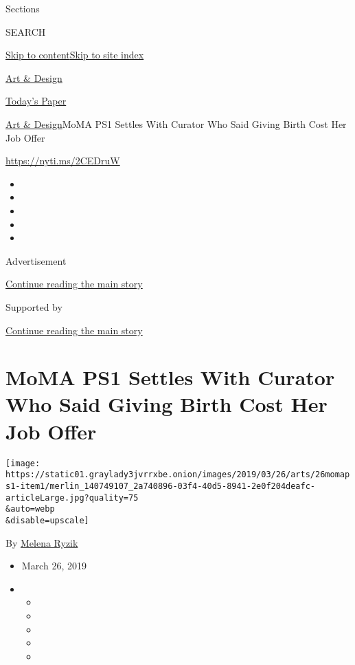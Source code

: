 Sections

SEARCH

\protect\hyperlink{site-content}{Skip to
content}\protect\hyperlink{site-index}{Skip to site index}

\href{https://www.nytimes3xbfgragh.onion/section/arts/design}{Art \&
Design}

\href{https://myaccount.nytimes3xbfgragh.onion/auth/login?response_type=cookie\&client_id=vi}{}

\href{https://www.nytimes3xbfgragh.onion/section/todayspaper}{Today's
Paper}

\href{/section/arts/design}{Art \& Design}\textbar{}MoMA PS1 Settles
With Curator Who Said Giving Birth Cost Her Job Offer

\url{https://nyti.ms/2CEDruW}

\begin{itemize}
\item
\item
\item
\item
\item
\end{itemize}

Advertisement

\protect\hyperlink{after-top}{Continue reading the main story}

Supported by

\protect\hyperlink{after-sponsor}{Continue reading the main story}

\hypertarget{moma-ps1-settles-with-curator-who-said-giving-birth-cost-her-job-offer}{%
\section{MoMA PS1 Settles With Curator Who Said Giving Birth Cost Her
Job
Offer}\label{moma-ps1-settles-with-curator-who-said-giving-birth-cost-her-job-offer}}

\texttt{[image: https://static01.graylady3jvrrxbe.onion/images/2019/03/26/arts/26momaps1-item1/merlin\_140749107\_2a740896-03f4-40d5-8941-2e0f204deafc-articleLarge.jpg?quality=75\\\&auto=webp\\\&disable=upscale]}

By \href{https://www.nytimes3xbfgragh.onion/by/melena-ryzik}{Melena
Ryzik}

\begin{itemize}
\item
  March 26, 2019
\item
  \begin{itemize}
  \item
  \item
  \item
  \item
  \item
  \end{itemize}
\end{itemize}


